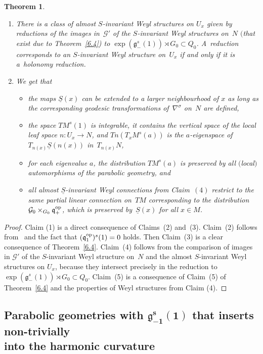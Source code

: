 \documentclass[pdftex]{sigma}
\newcommand{\si}{\sigma}
\newcommand{\un}{\underline}
\newcommand{\ba}{\mathcal{G}}
\newcommand{\fg}{\mathfrak g}
\newcommand{\fv}{\mathfrak q}
\newcommand{\fp}{\mathfrak p}
\newcommand{\fl}{\mathfrak l}
\numberwithin{equation}{section}
\newtheorem{Theorem}{Theorem}[section]
\begin{document}
\begin{Theorem}
\begin{enumerate}
The pseudo-group generated by all local $s$-symmetries is locally transitive at~$x$ if and only if $\fv/\fp\subset \fl/(\fl\cap \fp)$, i.e., if and only if $(R^\si(n(x)))_\si$ spans the whole $\fv/\fp$.
\item[$4.$] There is a class of almost $S$-invariant Weyl structures on $U_x$ given by reductions of the images in~$\ba'$ of the $S$-invariant Weyl structures on~$N$ $($that exist due to Theorem~{\rm \ref{6.4})} to $\exp(\fg_-^s(1))\rtimes G_0\subset Q_0$. A~reduction corresponds to an $S$-invariant Weyl structure on~$U_x$ if and only if it is a~holonomy reduction.
\item[$5.$] We get that
\begin{itemize}\itemsep=0pt
\item the maps $\un S(x)$ can be extended to a larger neighbourhood of $x$ as long as the corresponding geodesic transformations of~$\nabla^\si$ on~$N$ are defined,
\item the space $TM^s(1)$ is integrable, it contains the vertical space of the local leaf space $n\colon U_x\to N$, and $Tn(T_xM^s(a))$ is the $a$-eigenspace of $T_{n(x)}\un S(n(x))$ in~$T_{n(x)}N$,
\item for each eigenvalue $a$, the distribution $TM^s(a)$ is preserved by all $($local$)$ automorphisms of the parabolic geometry, and
\item all almost $\un S$-invariant Weyl connections from Claim~$(4)$ restrict to the same partial linear connection on~$TM$ corresponding to the distribution $\ba_0\times_{G_0}\fv^{\rm op}_+$, which is preserved by~$\un S(x)$ for all $x\in M$.
\end{itemize}
\end{enumerate}
\end{Theorem}
\begin{proof}
Claim (1) is a direct consequence of Claims~(2) and~(3). Claim~(2) follows from~\cite{cap-cor} and the fact that $(\fv^{\rm op}_1)^s(1)=0$ holds. Then Claim~(3) is a clear consequence of Theorem~\ref{6.4}. Claim~(4) follows from the comparison of images in $\ba'$ of the $S$-invariant Weyl structure on~$N$ and the almost $S$-invariant Weyl structures on $U_x$, because they intersect precisely in the reduction to $\exp(\fg_-^s(1))\rtimes G_0\subset Q_0$. Claim~(5) is a consequence of Claim~(5) of Theorem~\ref{6.4} and the properties of Weyl structures from Claim (4).
\end{proof}

\subsection[Parabolic geometries with $\fg_{-1}^s(1)$ that inserts non-trivially into the harmonic curvature]{Parabolic geometries with $\boldsymbol{\fg_{-1}^s(1)}$ that inserts non-trivially\\ into the harmonic curvature}
\end{document}
